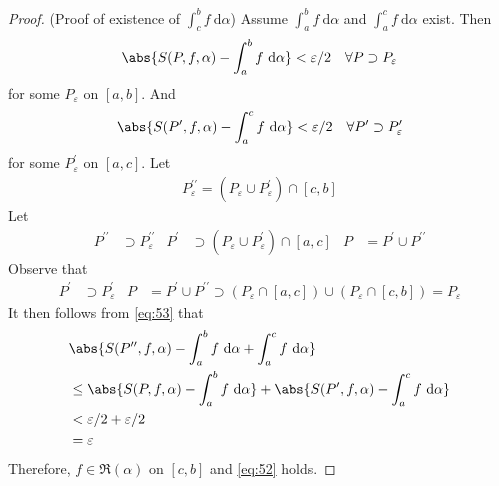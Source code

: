 \documentclass[thmcnt=section, 12pt]{elegantbook}
\begin{document}
\begin{proof}
    \par (Proof of existence of $\int_c^b f \ \mathrm{d}\alpha$) Assume $\int_a^b f \ \mathrm{d}\alpha$ and $\int_a^c f \ \mathrm{d}\alpha$ exist. Then 
    \begin{align*}
        \abs{S(P, f, \alpha) - \int_a^b f \ \mathrm{d}\alpha} < \varepsilon / 2
        \quad \forall P \supset P_\varepsilon
    \end{align*}
    for some $P_\varepsilon$ on $[a, b]$. And
    \begin{align*}
        \abs{S(P^\prime, f, \alpha) - \int_a^c f \ \mathrm{d}\alpha} < \varepsilon / 2
        \quad \forall P^\prime \supset P_\varepsilon^\prime
    \end{align*}
    for some $P_\varepsilon^\prime$ on $[a, c]$.
    Let
    \begin{align*}
        P_\varepsilon^{\prime\prime} = (P_\varepsilon \cup P_\varepsilon^\prime) \cap [c, b]
    \end{align*}
    Let
    \begin{align*}
        P^{\prime\prime} &\supset P_\varepsilon^{\prime\prime} &
        P^\prime &\supset (P_\varepsilon \cup P_\varepsilon^\prime) \cap [a, c] &
        P &= P^\prime \cup P^{\prime\prime}
    \end{align*} 
    Observe that 
    \begin{align*}
        P^\prime &\supset P_\varepsilon^\prime &
        P &= P^\prime \cup P^{\prime\prime}
        \supset (P_\varepsilon \cap [a, c]) \cup (P_\varepsilon \cap [c, b])
        = P_\varepsilon
    \end{align*}
    It then follows from \eqref{eq:53} that
    \begin{align*}
        &\abs{
            S(P^{\prime\prime}, f, \alpha)
            - \int_a^b f \ \mathrm{d}\alpha
            + \int_a^c f \ \mathrm{d}\alpha 
        } \\ 
        &\leq \abs{
            S(P, f, \alpha)
            - \int_a^b f \ \mathrm{d}\alpha
        } + \abs{
            S(P^\prime, f, \alpha)
            - \int_a^c f \ \mathrm{d}\alpha
        } \\ 
        &< \varepsilon / 2 + \varepsilon / 2 \\ 
        &= \varepsilon
    \end{align*} 
    Therefore, $f \in \mathfrak{R}(\alpha)$ on $[c, b]$ and \eqref{eq:52} holds.




\end{proof}
\end{document}
